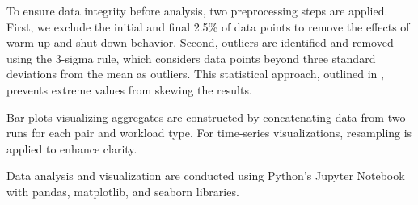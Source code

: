 To ensure data integrity before analysis, two preprocessing steps are applied. First, we exclude the initial and final 2.5\% of data points to remove the effects of warm-up and shut-down behavior. Second, outliers are identified and removed using the 3-sigma rule, which considers data points beyond three standard deviations from the mean as outliers. This statistical approach, outlined in \cite{}, prevents extreme values from skewing the results.

Bar plots visualizing aggregates are constructed by concatenating data from two runs for each pair and workload type. For time-series visualizations, resampling is applied to enhance clarity.

Data analysis and visualization are conducted using Python's Jupyter Notebook with pandas, matplotlib, and seaborn libraries.



